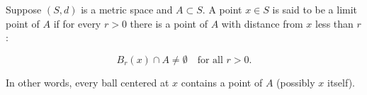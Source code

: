Suppose $(S, d)$ is a metric space and $A \subset S$. A point $x \in S$ is said to be a limit point of $A$ if for every $r > 0$ there is a point of $A$ with distance from $x$ less than $r$:

$$B_r(x) \cap A \neq \emptyset \quad \text{for all } r > 0.$$

In other words, every ball centered at $x$ contains a point of $A$ (possibly $x$ itself).
